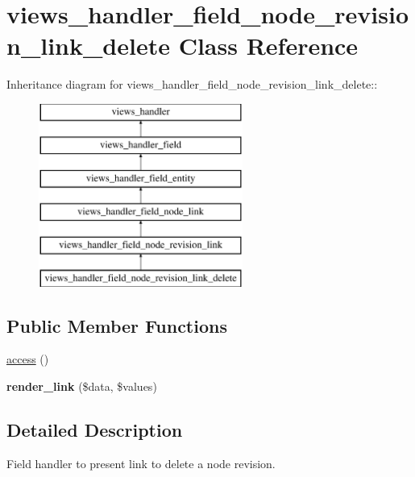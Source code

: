 \hypertarget{classviews__handler__field__node__revision__link__delete}{
\section{views\_\-handler\_\-field\_\-node\_\-revision\_\-link\_\-delete Class Reference}
\label{classviews__handler__field__node__revision__link__delete}
}
Inheritance diagram for views\_\-handler\_\-field\_\-node\_\-revision\_\-link\_\-delete::\begin{figure}[H]
\begin{center}
\leavevmode
\includegraphics[height=6cm]{classviews__handler__field__node__revision__link__delete}
\end{center}
\end{figure}
\subsection*{Public Member Functions}
\begin{DoxyCompactItemize}
\item 
\hyperlink{classviews__handler__field__node__revision__link__delete_a8d1e660c4945e837ced26d6f12a6521e}{access} ()
\item 
\hypertarget{classviews__handler__field__node__revision__link__delete_a5db7b4219d483b1189cc8a15c7d426b0}{
{\bfseries render\_\-link} (\$data, \$values)}
\label{classviews__handler__field__node__revision__link__delete_a5db7b4219d483b1189cc8a15c7d426b0}

\end{DoxyCompactItemize}


\subsection{Detailed Description}
Field handler to present link to delete a node revision. 

